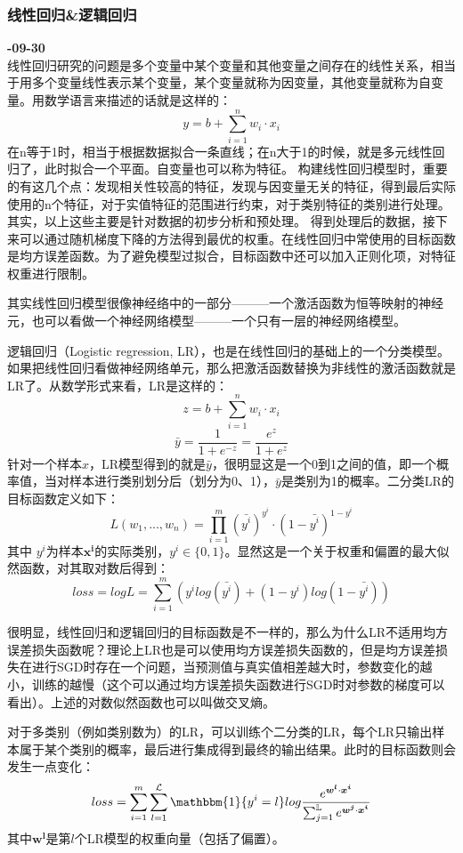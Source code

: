 \subsubsection{线性回归\&逻辑回归}
\textbf{-09-30}\\
线性回归研究的问题是多个变量中某个变量和其他变量之间存在的线性关系，相当于用多个变量线性表示某个变量，某个变量就称为因变量，其他变量就称为自变量。用数学语言来描述的话就是这样的：
$$
y=b + \sum_{i=1}^{n} w_i \cdot x_i 
$$
在n等于1时，相当于根据数据拟合一条直线；在n大于1的时候，就是多元线性回归了，此时拟合一个平面。自变量也可以称为特征。
构建线性回归模型时，重要的有这几个点：发现相关性较高的特征，发现与因变量无关的特征，得到最后实际使用的n个特征，对于实值特征的范围进行约束，对于类别特征的类别进行处理。其实，以上这些主要是针对数据的初步分析和预处理。
得到处理后的数据，接下来可以通过随机梯度下降的方法得到最优的权重。在线性回归中常使用的目标函数是均方误差函数。为了避免模型过拟合，目标函数中还可以加入正则化项，对特征权重进行限制。

其实线性回归模型很像神经络中的一部分———一个激活函数为恒等映射的神经元，也可以看做一个神经网络模型———一个只有一层的神经网络模型。

逻辑回归（Logistic regression, LR），也是在线性回归的基础上的一个分类模型。如果把线性回归看做神经网络单元，那么把激活函数替换为非线性的激活函数就是LR了。从数学形式来看，LR是这样的：
$$
z = b + \sum_{i=1}^{n} w_i \cdot x_i 
$$
$$
\bar{y} = \frac{1}{1 + e^{-z}} = \frac{e^z}{1 + e^z}
$$
针对一个样本$x$，LR模型得到的就是$\bar{y}$，很明显这是一个0到1之间的值，即一个概率值，当对样本进行类别划分后（划分为0、1），$\bar{y}$是类别为1的概率。二分类LR的目标函数定义如下：
$$
L(w_1,...,w_n) = \prod_{i = 1}^{m} (\bar{y^i} )^{y^i} \cdot ( 1 - \bar{y^i}) ^ {1 - y^i}
$$
其中 $y^i$为样本$\boldsymbol{x^i}$的实际类别，$y^i \in \{0, 1\}$。显然这是一个关于权重和偏置的最大似然函数，对其取对数后得到：
$$
loss = log L = \sum_{i=1}^{m} \left( y^i log (\bar{y^i}) + (1 - y^i) log ( 1 - \bar{y^i}) \right)
$$

很明显，线性回归和逻辑回归的目标函数是不一样的，那么为什么LR不适用均方误差损失函数呢？理论上LR也是可以使用均方误差损失函数的，但是均方误差损失在进行SGD时存在一个问题，当预测值与真实值相差越大时，参数变化的越小，训练的越慢（{\color{red}这个可以通过均方误差损失函数进行SGD时对参数的梯度可以看出}）。上述的对数似然函数也可以叫做交叉熵。

对于多类别（例如类别数为）的LR，可以训练个二分类的LR，每个LR只输出样本属于某个类别的概率，最后进行集成得到最终的输出结果。此时的目标函数则会发生一点变化：
$$
loss = \sum_{i=1}^{m} \sum_{l=1}^{\mathcal{L}} \mathbbm{1}\{y^i = l\} log \frac{e^{ \boldsymbol{w^l} \cdot \boldsymbol{x^i} } }{ \sum_{j=1}^{\mathbb{L}} e^{ \boldsymbol{w^j} \cdot \boldsymbol{x^i}} }
$$
其中$\boldsymbol{w^l}$是第$l$个LR模型的权重向量（包括了偏置）。

